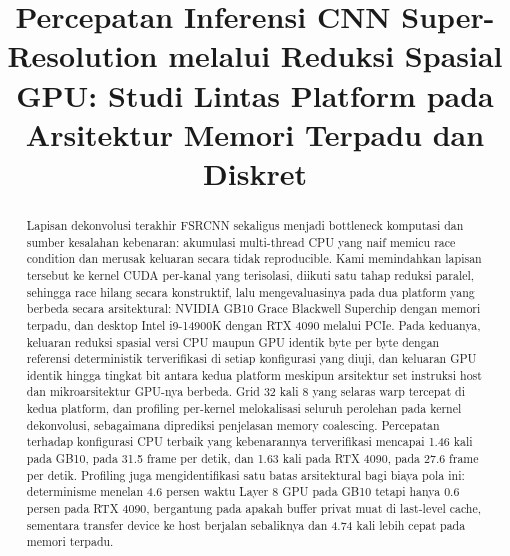 \documentclass[conference]{IEEEtran}
\begin{document}
\title{Percepatan Inferensi CNN Super-Resolution melalui Reduksi Spasial GPU: Studi Lintas Platform pada Arsitektur Memori Terpadu dan Diskret}

\author{
}

\maketitle

\begin{abstract}
Lapisan dekonvolusi terakhir FSRCNN sekaligus menjadi bottleneck komputasi dan sumber kesalahan kebenaran: akumulasi multi-thread CPU yang naif memicu race condition dan merusak keluaran secara tidak reproducible. Kami memindahkan lapisan tersebut ke kernel CUDA per-kanal yang terisolasi, diikuti satu tahap reduksi paralel, sehingga race hilang secara konstruktif, lalu mengevaluasinya pada dua platform yang berbeda secara arsitektural: NVIDIA GB10 Grace Blackwell Superchip dengan memori terpadu, dan desktop Intel i9-14900K dengan RTX 4090 melalui PCIe. Pada keduanya, keluaran reduksi spasial versi CPU maupun GPU identik byte per byte dengan referensi deterministik terverifikasi di setiap konfigurasi yang diuji, dan keluaran GPU identik hingga tingkat bit antara kedua platform meskipun arsitektur set instruksi host dan mikroarsitektur GPU-nya berbeda. Grid 32 kali 8 yang selaras warp tercepat di kedua platform, dan profiling per-kernel melokalisasi seluruh perolehan pada kernel dekonvolusi, sebagaimana diprediksi penjelasan memory coalescing. Percepatan terhadap konfigurasi CPU terbaik yang kebenarannya terverifikasi mencapai 1.46 kali pada GB10, pada 31.5 frame per detik, dan 1.63 kali pada RTX 4090, pada 27.6 frame per detik. Profiling juga mengidentifikasi satu batas arsitektural bagi biaya pola ini: determinisme menelan 4.6 persen waktu Layer 8 GPU pada GB10 tetapi hanya 0.6 persen pada RTX 4090, bergantung pada apakah buffer privat muat di last-level cache, sementara transfer device ke host berjalan sebaliknya dan 4.74 kali lebih cepat pada memori terpadu.
\end{abstract}
\end{document}
